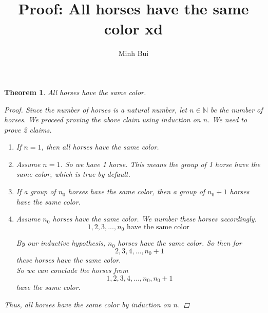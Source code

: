 \documentclass{article}
\author{Minh Bui}
\title{Proof: All horses have the same color xd}
\newtheorem{theorem}{Theorem}
\begin{document}
\maketitle
\begin{theorem}
    All horses have the same color.
    \begin{proof}
        Since the number of horses is a natural number, let $n \in \mathbb{N}$ be the number of horses. We proceed proving the above claim using induction on $n$. We need to prove 2 claims.
        \begin{enumerate}
            \item[1.] If $n = 1$, then all horses have the same color.
            \item[] Assume $n = 1$. So we have 1 horse. This means the group of 1 horse have the same color, which is true by default.
            \item[2.] If a group of $n_0$ horses have the same color, then a group of $n_0 + 1$ horses have the same color.
            \item[] Assume $n_0$ horses have the same color. 
                We number these horses accordingly.
                \begin{equation*}
                    1, 2, 3, ..., n_0 \text{ have the same color }
                \end{equation*}

                By our inductive hypothesis, $n_0$ horses have the same color. So then for
                \begin{equation*}
                    2, 3, 4, ..., n_0 + 1
                \end{equation*}
                these horses have the same color.\\
                So we can conclude the horses from
                \begin{equation*}
                    1, 2, 3, 4, ..., n_0, n_0 + 1
                \end{equation*}
                have the same color.
        \end{enumerate}
        Thus, all horses have the same color by induction on $n$.
    \end{proof}
\end{theorem}
\end{document}
